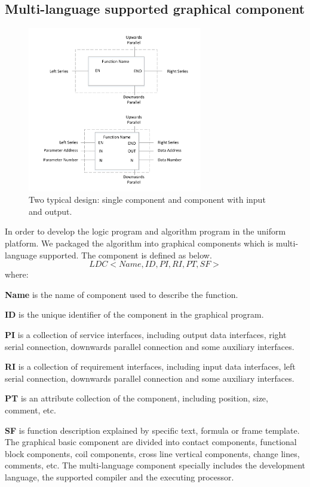 \documentclass[journal,UTF8]{IEEEtran}
\begin{document}
\subsection{Multi-language supported graphical component}
\begin{figure}
	\centering
	\includegraphics[width=3in]{fig/FIG6.pdf}
	\caption{ Two typical design: single component and component with input and output.}
	\label{fig:Component}
\end{figure}
In order to develop the logic program and algorithm program in the uniform platform. We packaged the algorithm into graphical components which is multi-language supported. The component is defined as below.
\begin{equation}
LDC<Name,ID,PI,RI,PT,SF>
\end{equation} 
where:

\textbf{Name} is the name of component used to describe the function.

\textbf{ID} is the unique identifier of the component in the graphical program.

\textbf{PI} is a collection of service interfaces, including output data interfaces, right serial connection, downwards parallel connection and some auxiliary interfaces.

\textbf{RI} is a collection of requirement interfaces, including input data interfaces, left serial connection, downwards parallel connection and some auxiliary interfaces.

\textbf{PT} is an attribute collection of the component, including position, size, comment, etc.

\textbf{SF} is function description explained by specific text, formula or frame template. The graphical basic component are divided into contact components, functional block components, coil components, cross line vertical components, change lines, comments, etc. The multi-language component specially includes the development language, the supported compiler and the executing processor.
\end{document}
